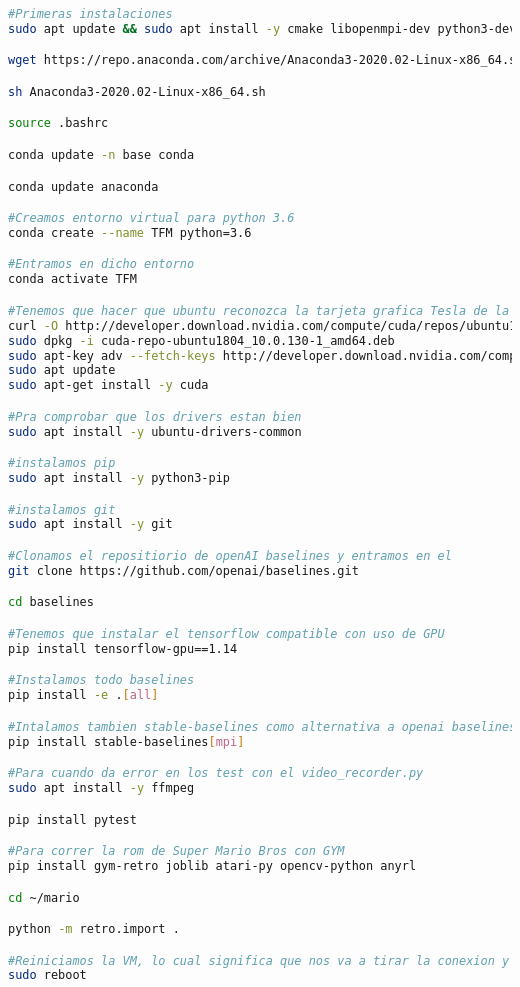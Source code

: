 \documentclass[11pt,fleqn]{book} %
\begin{document}
\begin{lstlisting}[language=bash]
#Primeras instalaciones
sudo apt update && sudo apt install -y cmake libopenmpi-dev python3-dev zlib1g-dev

wget https://repo.anaconda.com/archive/Anaconda3-2020.02-Linux-x86_64.sh

sh Anaconda3-2020.02-Linux-x86_64.sh

source .bashrc

conda update -n base conda

conda update anaconda

#Creamos entorno virtual para python 3.6
conda create --name TFM python=3.6

#Entramos en dicho entorno
conda activate TFM

#Tenemos que hacer que ubuntu reconozca la tarjeta grafica Tesla de la VM instalando sus drivers para ubuntu 18.04
curl -O http://developer.download.nvidia.com/compute/cuda/repos/ubuntu1804/x86_64/cuda-repo-ubuntu1804_10.0.130-1_amd64.deb
sudo dpkg -i cuda-repo-ubuntu1804_10.0.130-1_amd64.deb
sudo apt-key adv --fetch-keys http://developer.download.nvidia.com/compute/cuda/repos/ubuntu1804/x86_64/7fa2af80.pub
sudo apt update
sudo apt-get install -y cuda

#Pra comprobar que los drivers estan bien
sudo apt install -y ubuntu-drivers-common

#instalamos pip
sudo apt install -y python3-pip

#instalamos git
sudo apt install -y git

#Clonamos el repositiorio de openAI baselines y entramos en el
git clone https://github.com/openai/baselines.git

cd baselines

#Tenemos que instalar el tensorflow compatible con uso de GPU
pip install tensorflow-gpu==1.14

#Instalamos todo baselines
pip install -e .[all]

#Intalamos tambien stable-baselines como alternativa a openai baselines
pip install stable-baselines[mpi]

#Para cuando da error en los test con el video_recorder.py
sudo apt install -y ffmpeg

pip install pytest

#Para correr la rom de Super Mario Bros con GYM
pip install gym-retro joblib atari-py opencv-python anyrl

cd ~/mario

python -m retro.import .

#Reiniciamos la VM, lo cual significa que nos va a tirar la conexion y vamos a tener que volver a entrar por SSH
sudo reboot
\end{lstlisting} 
\end{document}
